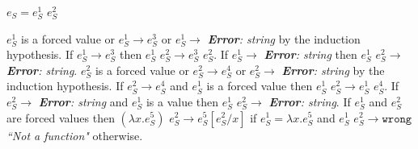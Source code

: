 \begin{case}
$e_{S}=e_{S}^{1}$ $e_{S}^{2}$

$e_{S}^{1}$ is a forced value or $e_{S}^{1}\rightarrow e_{S}^{3}$ or $e_{S}^{1}\rightarrow$ \emph{\textbf{Error}: string} by the induction hypothesis.  If $e_{S}^{1}\rightarrow e_{S}^{3}$ then $e_{S}^{1}$ $e_{S}^{2}\rightarrow e_{S}^{3}$ $e_{S}^{2}$.  If $e_{S}^{1}\rightarrow$ \emph{\textbf{Error}: string} then $e_{S}^{1}$ $e_{S}^{2}\rightarrow$ \emph{\textbf{Error}: string}.  $e_{S}^{2}$ is a forced value or $e_{S}^{2}\rightarrow e_{S}^{4}$ or $e_{S}^{2}\rightarrow$ \emph{\textbf{Error}: string} by the induction hypothesis.  If $e_{S}^{2}\rightarrow e_{S}^{4}$ and $e_{S}^{1}$ is a forced value then $e_{S}^{1}$ $e_{S}^{2}\rightarrow e_{S}^{1}$ $e_{S}^{4}$.  If $e_{S}^{2}\rightarrow$ \emph{\textbf{Error}: string} and $e_{S}^{1}$ is a value then $e_{S}^{1}$ $e_{S}^{2}\rightarrow$ \emph{\textbf{Error}: string}.  If $e_{S}^{1}$ and $e_{S}^{2}$ are forced values then $(\lambda x.e_{S}^{5})$ $e_{S}^{2}\rightarrow e_{S}^{5}[e_{S}^{2}/x]$ if $e_{S}^{1}=\lambda x.e_{S}^{5}$ and $e_{S}^{1}$ $e_{S}^{2}\rightarrow\mathtt{wrong}$ \emph{``Not a function"} otherwise.
\end{case}